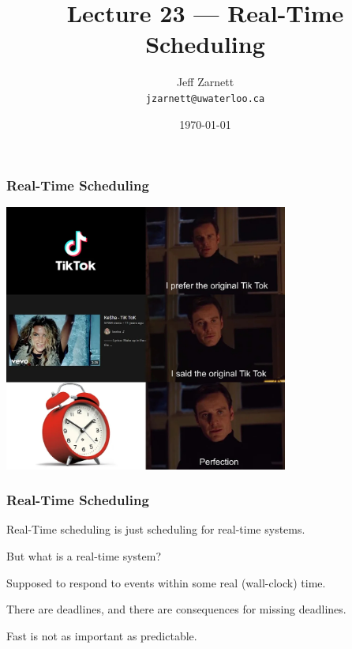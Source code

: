 

\title{Lecture 23 --- Real-Time Scheduling}

\author{Jeff Zarnett \\ \small \texttt{jzarnett@uwaterloo.ca}}
\date{\today}




\begin{frame}
  \titlepage

 \end{frame}
 
\begin{frame}
\frametitle{Real-Time Scheduling}


\begin{center}
	\includegraphics[width=0.7\textwidth]{images/tiktok.jpg}
\end{center}

\end{frame}

\begin{frame}
\frametitle{Real-Time Scheduling}

Real-Time scheduling is just scheduling for real-time systems.

But what is a real-time system?

Supposed to respond to events within some real (wall-clock) time. 

There are deadlines, and there are consequences for missing deadlines. 

Fast is not as important as predictable.

\end{frame}

